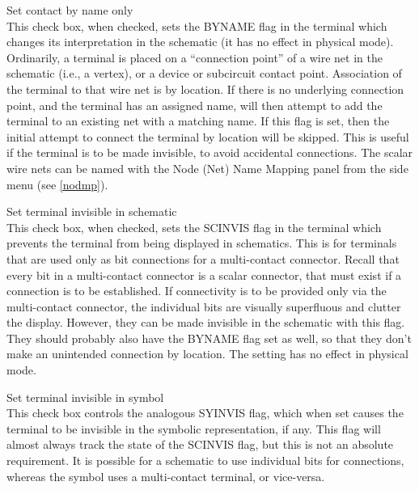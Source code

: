 \begin{description}
\item{\cb Set contact by name only}\\
This check box, when checked, sets the {\et BYNAME} flag in the
terminal which changes its interpretation in the schematic (it has no
effect in physical mode).  Ordinarily, a terminal is placed on a
``connection point'' of a wire net in the schematic (i.e., a vertex),
or a device or subcircuit contact point.  Association of the terminal
to that wire net is by location.  If there is no underlying connection
point, and the terminal has an assigned name, {\Xic} will then attempt
to add the terminal to an existing net with a matching name.  If this
flag is set, then the initial attempt to connect the terminal by
location will be skipped.  This is useful if the terminal is to be
made invisible, to avoid accidental connections.  The scalar wire nets
can be named with the {\cb Node (Net) Name Mapping} panel from the
side menu (see \ref{nodmp}).

\item{\cb Set terminal invisible in schematic}\\
This check box, when checked, sets the {\et SCINVIS} flag in the
terminal which prevents the terminal from being displayed in
schematics.  This is for terminals that are used only as bit
connections for a multi-contact connector.  Recall that every bit in a
multi-contact connector is a scalar connector, that must exist if a
connection is to be established.  If connectivity is to be provided
only via the multi-contact connector, the individual bits are visually
superfluous and clutter the display.  However, they can be made
invisible in the schematic with this flag.  They should probably also
have the {\et BYNAME} flag set as well, so that they don't make an
unintended connection by location.  The setting has no effect in
physical mode.

\item{\cb Set terminal invisible in symbol}\\
This check box controls the analogous {\et SYINVIS} flag, which when
set causes the terminal to be invisible in the symbolic
representation, if any.  This flag will almost always track the state
of the {\et SCINVIS} flag, but this is not an absolute requirement. 
It is possible for a schematic to use individual bits for connections,
whereas the symbol uses a multi-contact terminal, or vice-versa.
\end{description}

